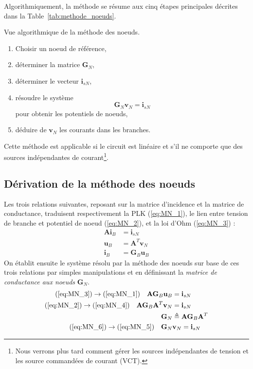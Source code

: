 Algorithmiquement, la méthode se résume aux cinq étapes principales décrites dans la Table~\ref{tab:methode_noeuds}.
\begin{table}[tb]
	\caption{Vue algorithmique de la méthode des noeuds. \label{tab:methode_noeuds}}
	\begin{boxedminipage}{\textwidth}
	\begin{enumerate}
	\item Choisir un noeud de référence,
	\item déterminer la matrice $\mathbf{G}_N$,
	\item déterminer le vecteur $\mathbf{i}_{sN}$,
	\item résoudre le système $$\mathbf{G}_N \mathbf{v}_N = \mathbf{i}_{sN}$$ pour obtenir les potentiels de noeuds,
	\item déduire de $\mathbf{v}_N$ les courants dans les branches.
	\end{enumerate}
	\end{boxedminipage}
\end{table}
Cette méthode est applicable si le circuit est linéaire et s'il ne comporte que des sources indépendantes de courant\footnote{ Nous verrons plus tard comment gérer les sources indépendantes de tension et les source commandées de courant (VCT).}.

\subsection{Dérivation de la méthode des noeuds}

Les trois relations suivantes, reposant sur la matrice d'incidence et la matrice de conductance, traduisent respectivement la PLK (\ref{eq:MN_1}), le lien entre tension de branche et potentiel de noeud (\ref{eq:MN_2}), et la loi d'Ohm (\ref{eq:MN_3}) :
\begin{align}
\mathbf{A} \mathbf{i}_B &= \mathbf{i}_{sN} \label{eq:MN_1}\\
\mathbf{u}_B &= \mathbf{A}^T \mathbf{v}_{N} \label{eq:MN_2}\\
\mathbf{i}_B &= \mathbf{G}_B \mathbf{u}_{B} \label{eq:MN_3}
\end{align}
On établit ensuite le système résolu par la méthode des noeuds sur base de ces trois relations par simples manipulations et en définissant la \textit{matrice de conductance aux noeuds} $\mathbf{G}_N.$
\begin{align}
(\ref{eq:MN_3}) \rightarrow (\ref{eq:MN_1}) \quad \mathbf{A} \mathbf{G}_B \mathbf{u}_{B} &= \mathbf{i}_{sN} \label{eq:MN_4}\\
(\ref{eq:MN_2}) \rightarrow (\ref{eq:MN_4}) \quad \mathbf{A} \mathbf{G}_B \mathbf{A}^T \mathbf{v}_{N} &= \mathbf{i}_{sN} \label{eq:MN_5}\\
\mathbf{G}_N &\triangleq \mathbf{A} \mathbf{G}_B \mathbf{A}^T \label{eq:MN_6}\\
(\ref{eq:MN_6}) \rightarrow (\ref{eq:MN_5}) \quad \mathbf{G}_N &\mathbf{v}_N = \mathbf{i}_{sN}
\end{align}

